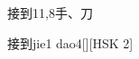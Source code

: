 \begin{entry}{接到}{11,8}{⼿、⼑}
  \begin{phonetics}{接到}{jie1 dao4}[][HSK 2]
  \end{phonetics}
\end{entry}
